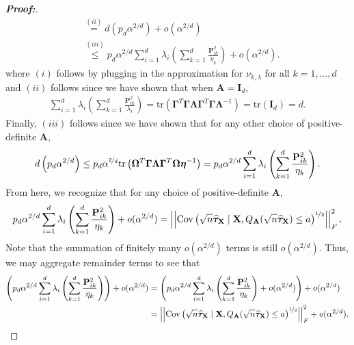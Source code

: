 \documentclass[11pt,twoside]{article}
\theoremstyle{definition}
\theoremstyle{remark}
\begin{document}
\begin{proof}[\textbf{Proof:}]
\begin{align*}
        &\overset{(ii)}{=} d\left( p_d \alpha^{2/d} \right)  + o(\alpha^{2/d}) \\
        &\overset{(iii)}{\leq} p_d \alpha^{2/d}  \sum^d_{i=1} \lambda_i \left( \sum^d_{k = 1}  \frac{\mathbf{P}^2_{i k }}{\eta_k} \right)  + o(\alpha^{2/d}).
\end{align*}
where $(i)$ follows by plugging in the approximation for $\nu_{k, \lambda}$ for all $k = 1, \ldots, d$ and $(ii)$ follows since we have shown that when $\mathbf{A} = \mathbf{I}_d$,
\begin{align*}
    \sum^d_{i=1} \lambda_i \left( \sum^d_{k = 1}  \frac{\mathbf{P}^2_{i k }}{\lambda_i} \right) = \text{tr}\left(  \mathbf{\Gamma}^T \mathbf{\Gamma} \mathbf{\Lambda} \mathbf{\Gamma}^T \mathbf{\Gamma} \bm{\Lambda}^{-1}   \right) = \text{tr}(\mathbf{I}_d) = d.
\end{align*}
Finally, $(iii)$ follows since we have shown that for any other choice of positive-definite $\mathbf{A}$,
\begin{align*}
    d\left( p_d \alpha^{2/d} \right) \leq p_d \alpha^{\nicefrac{2}{d}} \text{tr}\left(  \mathbf{\Omega}^T \mathbf{\Gamma} \mathbf{\Lambda} \mathbf{\Gamma}^T \mathbf{\Omega} \bm{\eta}^{-1}   \right) =  p_d \alpha^{2/d}  \sum^d_{i=1} \lambda_i \left( \sum^d_{k = 1}  \frac{\mathbf{P}^2_{i k }}{\eta_k} \right).
\end{align*}
From here, we recognize that for any choice of positive-definite  $\mathbf{A}$,
\begin{align*}
    p_d \alpha^{2/d}  \sum^d_{i=1} \lambda_i \left( \sum^d_{k = 1}  \frac{\mathbf{P}^2_{i k }}{\eta_k} \right) + o(\alpha^{2/d}) = \left|\left|\text{Cov}\left(\sqrt{n}\widehat{\bm{\tau}}_{\mathbf{X}} \mid \mathbf{X}, Q_{\mathbf{A}}(\sqrt{n} \widehat{\bm{\tau}}_{\mathbf{X}}) \leq a\right)^{\nicefrac{1}{2}}\right|\right|^2_F.
\end{align*}
Note that the summation of finitely many $o(\alpha^{2/d})$ terms is still $o(\alpha^{2/d})$. Thus, we may aggregate remainder terms to see that
\begin{align*}
    \left(p_d \alpha^{2/d}  \sum^d_{i=1} \lambda_i \left( \sum^d_{k = 1}  \frac{\mathbf{P}^2_{i k }}{\eta_k} \right) \right) + o(\alpha^{2/d}) &=  \left(p_d \alpha^{2/d}  \sum^d_{i=1} \lambda_i \left( \sum^d_{k = 1}  \frac{\mathbf{P}^2_{i k }}{\eta_k} \right) + o(\alpha^{2/d}) \right) + o(\alpha^{2/d}) \\
    &= \left|\left|\text{Cov}\left(\sqrt{n}\widehat{\bm{\tau}}_{\mathbf{X}} \mid \mathbf{X}, Q_{\mathbf{A}}(\sqrt{n} \widehat{\bm{\tau}}_{\mathbf{X}}) \leq a\right)^{\nicefrac{1}{2}}\right|\right|^2_F  + o(\alpha^{2/d}).

\end{align*}
\end{proof}
\end{document}
